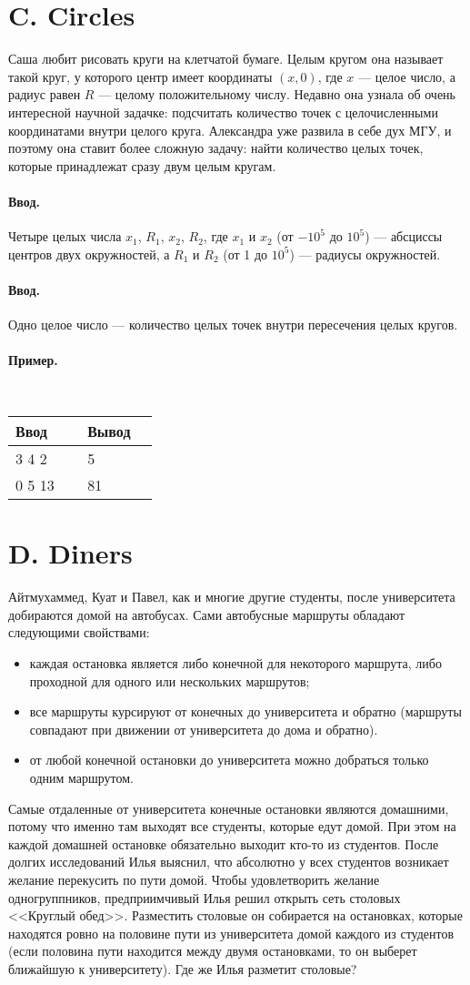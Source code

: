 \documentclass[10pt, a5paper]{article}
\newcommand{\informat}[1]
{
	\paragraph{Ввод.\\} #1
}
\newcommand{\examplee}[4]
{
	\paragraph{Пример.\\}
	{\tt
	\begin{tabular}{|p{0.4\linewidth}|p{0.4\linewidth}|}
	\hline
	Ввод 	& Вывод  	\\
	\hline
	#1 		& #2 		\\
	\hline
	#3		& #4		\\
	\hline
	\end{tabular}
	}
}
\begin{document}
\section*{C. Circles}

Саша любит рисовать круги на клетчатой бумаге. Целым кругом она называет такой круг, у которого центр имеет координаты $(x, 0)$, где $x$ --- целое число, а радиус равен $R$ --- целому положительному числу. Недавно она узнала об очень интересной научной задачке: подсчитать количество точек с целочисленными координатами внутри целого круга. Александра уже развила в себе дух МГУ, и поэтому она ставит более сложную задачу: найти количество целых точек, которые принадлежат сразу двум целым кругам.

\informat{Четыре целых числа $x_1$, $R_1$, $x_2$, $R_2$, где $x_1$ и $x_2$ (от $-10^5$ до $10^5$) --- абсциссы центров двух окружностей, а $R_1$ и $R_2$ (от 1 до $10^5$) --- радиусы окружностей.}
 
\informat{Одно целое число --- количество целых точек внутри пересечения целых кругов.}
 
\examplee{3 4 \newline -1 2}{5}{0 5 \newline 0 13}{81}
  
\section*{D. Diners}

Айтмухаммед, Куат и Павел, как и многие другие студенты, после университета добираются домой на автобусах. Сами автобусные маршруты обладают следующими свойствами: 
\begin{itemize}
\item каждая остановка является либо конечной для некоторого маршрута, либо проходной для одного или нескольких маршрутов;
\item все маршруты курсируют от конечных до университета и обратно (маршруты совпадают при движении от университета до дома и обратно).
\item от любой конечной остановки до университета можно добраться только одним маршрутом.
\end{itemize}
Самые отдаленные от университета конечные остановки являются домашними, потому что именно там выходят все студенты, которые едут домой. При этом на каждой домашней остановке обязательно выходит кто-то из студентов. После долгих исследований Илья выяснил, что абсолютно у всех студентов возникает желание перекусить по пути домой. Чтобы удовлетворить желание одногруппников, предприимчивый Илья решил открыть сеть столовых <<Круглый обед>>. Разместить столовые он собирается на остановках, которые находятся ровно на половине пути из университета домой каждого из студентов (если половина пути находится между двумя остановками, то он выберет ближайшую к университету). Где же Илья разметит столовые?
 
\end{document}
